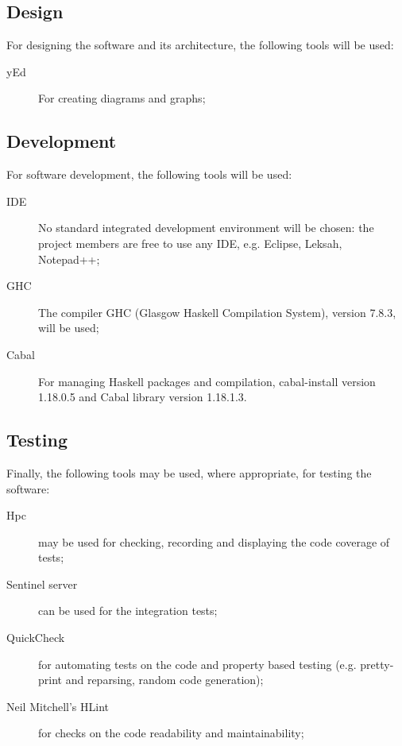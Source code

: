 \subsection{Design}
%
For designing the software and its architecture, the following tools will be used:
\begin{description}
	\item[yEd] For creating diagrams and graphs;
\end{description}

\subsection{Development}
%
%
%
For software development, the following tools will be used:
\begin{description}
	\item[IDE] No standard integrated development environment will be chosen: the project members are free to use any IDE, e.g. Eclipse, Leksah, Notepad++;
	\item[GHC] The compiler GHC (Glasgow Haskell Compilation System), version 7.8.3, will be used;
	\item[Cabal] For managing Haskell packages and compilation, cabal-install version 1.18.0.5 and Cabal library version 1.18.1.3.
\end{description}

\subsection{Testing}
%
%
%
%
Finally, the following tools may be used, where appropriate, for testing the software:
\begin{description}
	\item[Hpc] may be used for checking, recording and displaying the code coverage of tests;
	\item[Sentinel server] can be used for the integration tests;
	\item[QuickCheck] for automating tests on the code and property based testing (e.g. pretty-print and reparsing, random code generation);
	\item[Neil Mitchell's HLint] for checks on the code readability and maintainability;
\end{description}
